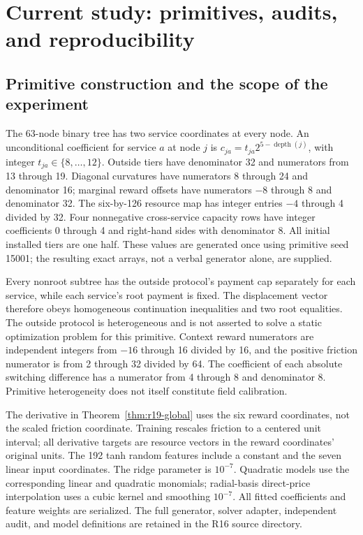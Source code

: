 \section{Current study: primitives, audits, and reproducibility}\label{ec:r19-details}
\subsection{Primitive construction and the scope of the experiment}
The 63-node binary tree has two service coordinates at every node. An unconditional coefficient for service $a$ at node $j$ is $c_{ja}=t_{ja}2^{5-\operatorname{depth}(j)}$, with integer $t_{ja}\in\{8,\ldots,12\}$. Outside tiers have denominator 32 and numerators from 13 through 19. Diagonal curvatures have numerators 8 through 24 and denominator 16; marginal reward offsets have numerators $-8$ through 8 and denominator 32. The six-by-126 resource map has integer entries $-4$ through 4 divided by 32. Four nonnegative cross-service capacity rows have integer coefficients 0 through 4 and right-hand sides with denominator 8. All initial installed tiers are one half. These values are generated once using primitive seed 15001; the resulting exact arrays, not a verbal generator alone, are supplied.

Every nonroot subtree has the outside protocol's payment cap separately for each service, while each service's root payment is fixed. The displacement vector therefore obeys homogeneous continuation inequalities and two root equalities. The outside protocol is heterogeneous and is not asserted to solve a static optimization problem for this primitive. Context reward numerators are independent integers from $-16$ through 16 divided by 16, and the positive friction numerator is from 2 through 32 divided by 64. The coefficient of each absolute switching difference has a numerator from 4 through 8 and denominator 8. Primitive heterogeneity does not itself constitute field calibration.

The derivative in Theorem~\ref{thm:r19-global} uses the six reward coordinates, not the scaled friction coordinate. Training rescales friction to a centered unit interval; all derivative targets are resource vectors in the reward coordinates' original units. The 192 tanh random features include a constant and the seven linear input coordinates. The ridge parameter is $10^{-7}$. Quadratic models use the corresponding linear and quadratic monomials; radial-basis direct-price interpolation uses a cubic kernel and smoothing $10^{-7}$. All fitted coefficients and feature weights are serialized. The full generator, solver adapter, independent audit, and model definitions are retained in the R16 source directory.

